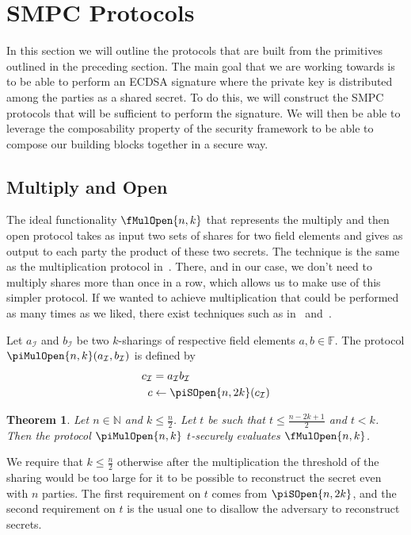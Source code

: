 \documentclass{article}
\newtheorem{theorem}{Theorem}
\theoremstyle{remark}
\newcommand{\N}{\mathbb{N}}
\newcommand{\F}{\mathbb{F}}
\begin{document}
\section{SMPC Protocols}

In this section we will outline the protocols that are built from the
primitives outlined in the preceding section. The main goal that we are working
towards is to be able to perform an ECDSA signature where the private key is
distributed among the parties as a shared secret. To do this, we will construct
the SMPC protocols that will be sufficient to perform the signature. We will
then be able to leverage the composability property of the security framework
to be able to compose our building blocks together in a secure way.

\subsection{Multiply and Open}

The ideal functionality $\fMulOpen{n,k}$ that represents the multiply and then
open protocol takes as input two sets of shares for two field elements and
gives as output to each party the product of these two secrets. The technique
is the same as the multiplication protocol in~\cite{gjkr96}. There, and in our
case, we don't need to multiply shares more than once in a row, which allows us
to make use of this simpler protocol. If we wanted to achieve multiplication
that could be performed as many times as we liked, there exist techniques such
as in~\cite{bgw88} and~\cite{b91}.

Let $a_\mathcal{I}$ and $b_\mathcal{I}$ be two $k$-sharings of respective field
elements $a, b \in \F$. The protocol $\piMulOpen{n,k}(a_\mathcal{I},
b_\mathcal{I})$ is defined by
\begin{align*}
	c_\mathcal{I} &= a_\mathcal{I}b_\mathcal{I}\\
	c &\leftarrow \piSOpen{n,2k}(c_\mathcal{I})
\end{align*}

\begin{theorem}
	Let $n \in \N$ and $k \le \frac{n}{2}$. Let $t$ be such that $t \le \frac{n
	- 2k + 1}{2}$ and $t < k$. Then the protocol $\piMulOpen{n,k}$ $t$-securely
	evaluates $\fMulOpen{n,k}$.
\end{theorem}

We require that $k \le \frac{n}{2}$ otherwise after the multiplication the
threshold of the sharing would be too large for it to be possible to
reconstruct the secret even with $n$ parties. The first requirement on $t$
comes from $\piSOpen{n,2k}$, and the second requirement on $t$ is the usual one
to disallow the adversary to reconstruct secrets.
\end{document}
